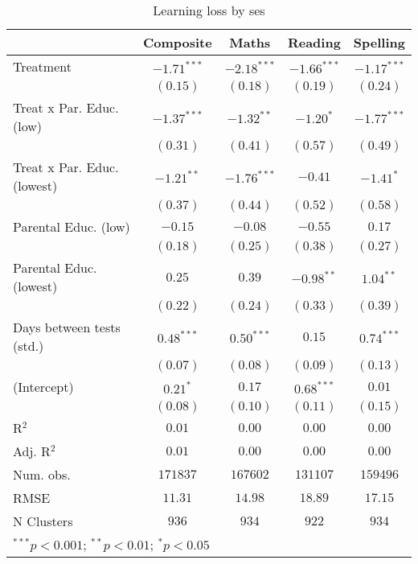 
\begin{table}
\begin{center}
\begin{tabular}{l c c c c}
\hline
 & Composite & Maths & Reading & Spelling \\
\hline
Treatment                   & $-1.71^{***}$ & $-2.18^{***}$ & $-1.66^{***}$ & $-1.17^{***}$ \\
                            & $(0.15)$      & $(0.18)$      & $(0.19)$      & $(0.24)$      \\
Treat x Par. Educ. (low)    & $-1.37^{***}$ & $-1.32^{**}$  & $-1.20^{*}$   & $-1.77^{***}$ \\
                            & $(0.31)$      & $(0.41)$      & $(0.57)$      & $(0.49)$      \\
Treat x Par. Educ. (lowest) & $-1.21^{**}$  & $-1.76^{***}$ & $-0.41$       & $-1.41^{*}$   \\
                            & $(0.37)$      & $(0.44)$      & $(0.52)$      & $(0.58)$      \\
Parental Educ. (low)        & $-0.15$       & $-0.08$       & $-0.55$       & $0.17$        \\
                            & $(0.18)$      & $(0.25)$      & $(0.38)$      & $(0.27)$      \\
Parental Educ. (lowest)     & $0.25$        & $0.39$        & $-0.98^{**}$  & $1.04^{**}$   \\
                            & $(0.22)$      & $(0.24)$      & $(0.33)$      & $(0.39)$      \\
Days between tests (std.)   & $0.48^{***}$  & $0.50^{***}$  & $0.15$        & $0.74^{***}$  \\
                            & $(0.07)$      & $(0.08)$      & $(0.09)$      & $(0.13)$      \\
(Intercept)                 & $0.21^{*}$    & $0.17$        & $0.68^{***}$  & $0.01$        \\
                            & $(0.08)$      & $(0.10)$      & $(0.11)$      & $(0.15)$      \\
\hline
R$^2$                       & $0.01$        & $0.00$        & $0.00$        & $0.00$        \\
Adj. R$^2$                  & $0.01$        & $0.00$        & $0.00$        & $0.00$        \\
Num. obs.                   & $171837$      & $167602$      & $131107$      & $159496$      \\
RMSE                        & $11.31$       & $14.98$       & $18.89$       & $17.15$       \\
N Clusters                  & $936$         & $934$         & $922$         & $934$         \\
\hline
\multicolumn{5}{l}{\scriptsize{$^{***}p<0.001$; $^{**}p<0.01$; $^{*}p<0.05$}}
\end{tabular}
\caption{Learning loss by ses}
\label{tableses}
\end{center}
\end{table}
